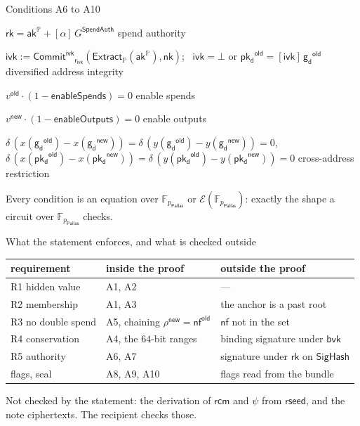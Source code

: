 \documentclass[aspectratio=169,11pt]{beamer}
\newcommand{\F}{\mathbb{F}}
\newcommand{\Ep}{\ensuremath{\mathcal{E}}}
\newcommand{\nfsym}{\ensuremath{\mathsf{nf}}}
\newcommand{\rksym}{\ensuremath{\mathsf{rk}}}
\newcommand{\gd}{\ensuremath{\mathsf{g_d}}}
\newcommand{\pkd}{\ensuremath{\mathsf{pk_d}}}
\newcommand{\aksym}{\ensuremath{\mathsf{ak}}}
\newcommand{\nksym}{\ensuremath{\mathsf{nk}}}
\newcommand{\ivk}{\ensuremath{\mathsf{ivk}}}
\newcommand{\rcm}{\ensuremath{\mathsf{rcm}}}
\newcommand{\rivk}{\ensuremath{\mathsf{r_{ivk}}}}
\newcommand{\Extract}{\ensuremath{\mathsf{Extract}}}
\newcommand{\CommitIvk}{\ensuremath{\mathsf{Commit}^{\mathsf{ivk}}}}
\newcommand{\PP}{\mathbb{P}}
\newcommand{\pP}{p_{\mathsf{Pallas}}}
\newcommand{\FP}{\F_{\pP}}
\newcommand{\EP}{\Ep(\FP)}
\newcommand{\Ext}{\Extract_{\PP}}
\newcommand{\akP}{\aksym^{\PP}}
\newcommand{\rk}{\rksym}
\newcommand{\GS}{G^{\mathsf{SpendAuth}}}
\newcommand{\old}{^{\mathsf{old}}}
\newcommand{\new}{^{\mathsf{new}}}
\newcommand{\rseed}{\mathsf{rseed}}
\newcommand{\rtag}[1]{\hfill{\small\color{arbdim}#1}}
\begin{document}
\begin{frame}{Conditions A6 to A10}
\small
\begin{description}[A10.]\itemsep6pt
\item[A6.] $\rk = \akP + [\alpha]\,\GS$ \rtag{spend authority}
\item[A7.] $\ivk := \CommitIvk_{\rivk}(\Ext(\akP), \nksym)$; \ $\ivk = \bot$ or
  $\pkd\old = [\ivk]\,\gd\old$\\ \rtag{diversified address integrity}
\item[A8.] $v\old \cdot (1 - \mathsf{enableSpends}) = 0$ \rtag{enable spends}
\item[A9.] $v\new \cdot (1 - \mathsf{enableOutputs}) = 0$ \rtag{enable outputs}
\item[A10.] $\delta\,(x(\gd\old) - x(\gd\new)) = \delta\,(y(\gd\old) - y(\gd\new)) = 0$,\\
  $\delta\,(x(\pkd\old) - x(\pkd\new)) = \delta\,(y(\pkd\old) - y(\pkd\new)) = 0$
  \rtag{cross-address restriction}
\end{description}
\vfill
Every condition is an equation over $\FP$ or $\EP$: exactly the shape a
circuit over $\FP$ checks.
\end{frame}

\begin{frame}{What the statement enforces, and what is checked outside}
\small
\begin{tabular}{@{}lll@{}}
\toprule
requirement & inside the proof & outside the proof \\
\midrule
R1 hidden value & A1, A2 & --- \\
R2 membership & A1, A3 & the anchor is a past root \\
R3 no double spend & A5, chaining $\rho\new = \nfsym\old$ & $\nfsym$ not in the set \\
R4 conservation & A4, the $64$-bit ranges & binding signature under $\mathsf{bvk}$ \\
R5 authority & A6, A7 & signature under $\rk$ on $\mathsf{SigHash}$ \\
flags, seal & A8, A9, A10 & flags read from the bundle \\
\bottomrule
\end{tabular}
\vfill
Not checked by the statement: the derivation of $\rcm$ and $\psi$ from
$\rseed$, and the note ciphertexts. The recipient checks those.
\end{frame}
\end{document}
